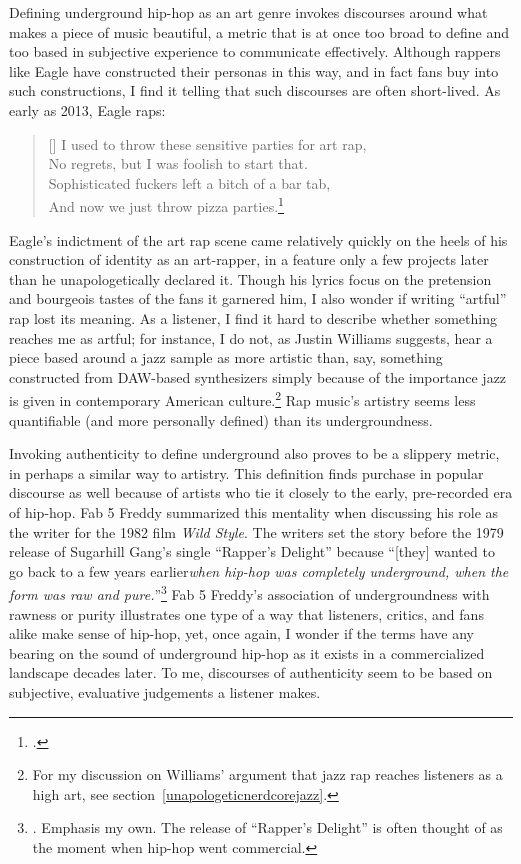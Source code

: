 Defining underground hip-hop as an art genre invokes discourses around what makes a piece 
of music beautiful, a metric that is at once too broad to define and too based in subjective
experience to communicate effectively. Although rappers like Eagle have constructed their 
personas in this way, and in fact fans buy into such constructions, I find it telling that 
such discourses are often short-lived. As early as 2013, Eagle raps:

\settowidth{\versewidth}{I used to throw these sensitive parties for art rap,}
    \begin{verse}[\versewidth]
        I used to throw these sensitive parties for art rap, \\
        No regrets, but I was foolish to start that. \\
        Sophisticated fuckers left a bitch of a bar tab, \\
        And now we just throw pizza parties.\footnote{
        \cite{milo2013}.}
    \end{verse}
Eagle's indictment of the art rap scene came relatively quickly on the heels of his 
construction of identity as an art-rapper, in a feature only a few projects later than
he unapologetically declared it. Though his lyrics focus on the pretension and bourgeois
tastes of the fans it garnered him, I also  wonder if writing ``artful'' rap lost its 
meaning. As a listener, I find it hard to describe whether something reaches me as artful;
for instance, I do not, as Justin Williams suggests, hear a piece based around a jazz sample
as more artistic than, say, something constructed from DAW-based synthesizers simply because
of the importance jazz is given in contemporary American culture.\footnote{
    For my discussion on Williams' argument that jazz rap reaches listeners as a  high art, 
    see section~\ref{unapologeticnerdcorejazz}.} 
Rap music's artistry seems less quantifiable (and more personally defined) than its undergroundness.

Invoking authenticity to define underground also proves to be a slippery metric, in perhaps a 
similar way to artistry. This definition finds purchase in popular discourse as well because of
artists who tie it closely to the early, pre-recorded era of hip-hop. Fab 5 Freddy summarized 
this mentality when discussing  his role as the writer for the 1982 film \textit{Wild Style}. 
The writers set the story before the 1979 release of Sugarhill Gang's single ``Rapper's Delight'' 
because ``[they] wanted to go back to a few years earlier\textellipsis \emph{when hip-hop was 
completely underground, when the form was raw and pure.}''\footnote{
    \autocite[23]{justinawilliamsRhyminStealinMusical2013}. Emphasis my own. The release
    of ``Rapper's Delight'' is often thought of as the moment when hip-hop went commercial.}
Fab 5 Freddy's association of undergroundness with rawness or purity illustrates one type
of a way that listeners, critics, and fans alike make sense of hip-hop, yet, once again, I 
wonder if the terms have any bearing on the sound of underground hip-hop as it exists in a
commercialized landscape decades later. To me, discourses of authenticity seem to be based 
on subjective, evaluative judgements a listener makes.

